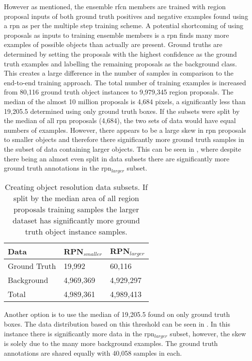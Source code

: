 \documentclass[a4paper,twoside]{article}
\begin{document}
However as mentioned, the ensemble \gls{rfcn} members are trained with region proposal inputs of both ground truth positives and negative examples found using a \gls{rpn} as per the multiple step training scheme. A potential shortcoming of using proposals as inputs to training ensemble members is a \gls{rpn} finds many more examples of possible objects than actually are present. Ground truths are determined by setting the proposals with the highest confidence as the ground truth examples and labelling the remaining proposals as the background class. This creates a large difference in the number of samples in comparison to the end-to-end training approach. The total number of training examples is increased from 80,116 ground truth object instances to 9,979,345 region proposals. The median of the almost 10 million proposals is 4,684 pixels, a significantly less than 19,205.5 determined using only ground truth boxes. If the subsets were split by the median of all \gls{rpn} proposals (4,684), the two sets of data would have equal numbers of examples. However, there appears to be a large skew in \gls{rpn} proposals to smaller objects and therefore there significantly more ground truth samples in the subset of data containing larger objects. This can be seen in , where despite there being an almost even split in data subsets there are significantly more ground truth annotations in the \gls{rpn}$_{larger}$ subset.

\begin{table}[h]
\centering
\caption{Creating object resolution data subsets. If split by the median area of all region proposals training samples the larger dataset has significantly more ground truth object instance samples.}
\label{tab:splitrpn}
\begin{tabular}{|l|l|l|}
\hline
\textbf{Data} & \textbf{RPN$_{smaller}$} & \textbf{RPN$_{larger}$} \\ \hline
Ground Truth & 19,992    & 60,116     \\ 
Background   & 4,969,369 & 4,929,297  \\ \hline
Total        & 4,989,361 & 4,989,413  \\ \hline
\end{tabular}
\end{table}

Another option is to use the median of 19,205.5 found on only ground truth boxes. The data distribution based on this threshold can be seen in . In this instance there is significantly more data in the \gls{rpn}$_{larger}$ subset, however, the skew is solely due to the many more background examples. The ground truth annotations are shared equally with 40,058 samples in each.
\end{document}

